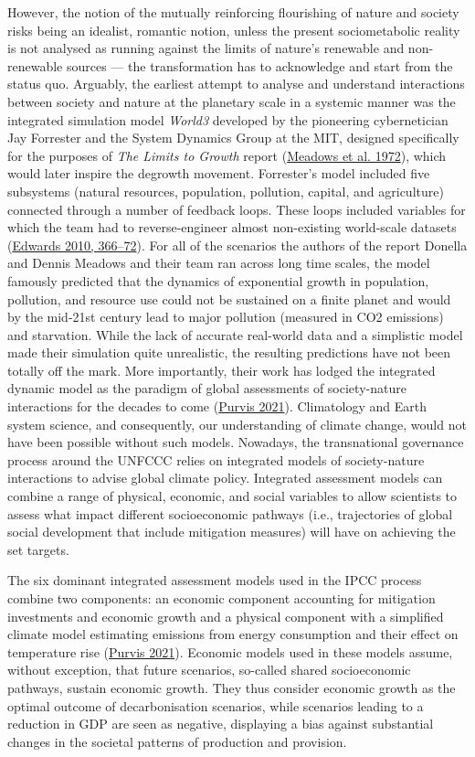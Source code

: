 \documentclass[a4paper, nobind]{templates/ociamthesis}
\begin{document}
However, the notion of the mutually reinforcing flourishing of nature and society risks being an idealist, romantic notion, unless the present sociometabolic reality is not analysed as running against the limits of nature's renewable and non-renewable sources --- the transformation has to acknowledge and start from the status quo. Arguably, the earliest attempt to analyse and understand interactions between society and nature at the planetary scale in a systemic manner was the integrated simulation model \emph{World3} developed by the pioneering cybernetician Jay Forrester and the System Dynamics Group at the MIT, designed specifically for the purposes of \emph{The Limits to Growth} report (\protect\hyperlink{ref-meadows_limits_1972}{Meadows et al. 1972}), which would later inspire the degrowth movement. Forrester's model included five subsystems (natural resources, population, pollution, capital, and agriculture) connected through a number of feedback loops. These loops included variables for which the team had to reverse-engineer almost non-existing world-scale datasets (\protect\hyperlink{ref-edwards_vast_2010}{Edwards 2010, 366--72}). For all of the scenarios the authors of the report Donella and Dennis Meadows and their team ran across long time scales, the model famously predicted that the dynamics of exponential growth in population, pollution, and resource use could not be sustained on a finite planet and would by the mid-21st century lead to major pollution (measured in CO2 emissions) and starvation. While the lack of accurate real-world data and a simplistic model made their simulation quite unrealistic, the resulting predictions have not been totally off the mark. More importantly, their work has lodged the integrated dynamic model as the paradigm of global assessments of society-nature interactions for the decades to come (\protect\hyperlink{ref-purvis_modelling_2021}{Purvis 2021}). Climatology and Earth system science, and consequently, our understanding of climate change, would not have been possible without such models. Nowadays, the transnational governance process around the UNFCCC relies on integrated models of society-nature interactions to advise global climate policy. Integrated assessment models can combine a range of physical, economic, and social variables to allow scientists to assess what impact different socioeconomic pathways (i.e., trajectories of global social development that include mitigation measures) will have on achieving the set targets.

The six dominant integrated assessment models used in the IPCC process combine two components: an economic component accounting for mitigation investments and economic growth and a physical component with a simplified climate model estimating emissions from energy consumption and their effect on temperature rise (\protect\hyperlink{ref-purvis_modelling_2021}{Purvis 2021}). Economic models used in these models assume, without exception, that future scenarios, so-called shared socioeconomic pathways, sustain economic growth. They thus consider economic growth as the optimal outcome of decarbonisation scenarios, while scenarios leading to a reduction in GDP are seen as negative, displaying a bias against substantial changes in the societal patterns of production and provision.
\end{document}
